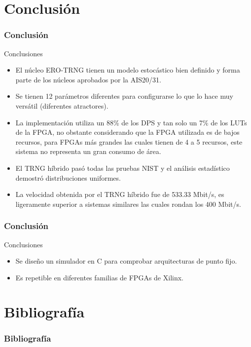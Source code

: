\documentclass[10pt]{beamer}
\begin{document}
\section{Conclusión}

\begin{frame}
    \frametitle{Conclusión}
    \begin{block}{Conclusiones}
        \justifying
        \begin{itemize}
        \item El núcleo ERO-TRNG tienen un modelo estocástico bien definido y forma parte de los núcleos aprobados por la AIS20/31.

        \item Se tienen 12 parámetros diferentes para configurarse lo que lo hace muy versátil (diferentes atractores).

        \item La implementación utiliza un 88\% de los DPS y tan solo un 7\% de los LUTs de la FPGA, no obstante considerando que la FPGA utilizada es de bajos recursos, para FPGAs más grandes las cuales tienen de 4 a 5 recursos, este sistema no representa un gran consumo de área.

        \item El TRNG híbrido pasó todas las pruebas NIST y el análisis estadístico demostró distribuciones uniformes.

        \item La velocidad obtenida por el TRNG híbrido fue de 533.33 Mbit/s, es ligeramente superior a sistemas similares las cuales rondan los 400 Mbit/s.

    \end{itemize}

	\end{block}
\end{frame}

\begin{frame}
    \frametitle{Conclusión}
    \begin{block}{Conclusiones}
        \justifying
        \begin{itemize}
        \item Se diseño un simulador en C para comprobar arquitecturas de punto fijo.
        \item Es repetible en diferentes familias de FPGAs de Xilinx.
    \end{itemize}

	\end{block}
\end{frame}


\section{Bibliografía}

\begin{frame}[t, allowframebreaks]
    \frametitle{Bibliografía}
	
	
\end{frame}
\end{document}
